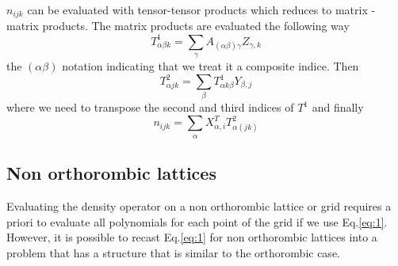 \documentclass[prb]{revtex4}
\begin{document}
$n_{ijk}$ can be evaluated with tensor-tensor products which reduces to matrix -
matrix products. The matrix products are evaluated the following way
\begin{equation}
  \label{eq:collocate:8}
  T^1_{\alpha\beta k} = \sum_{\gamma} A_{(\alpha\beta)\gamma} Z_{\gamma, k}
\end{equation}
the $(\alpha\beta)$ notation indicating that we treat it a composite indice. Then
\begin{equation}
  \label{eq:collocate:9}
  T^2_{\alpha j k} = \sum_{\beta} T^1_{\alpha k \beta} Y_{\beta, j}
\end{equation}
where we need to transpose the second and third indices of $T^1$ and finally
\begin{equation}
  \label{eq:collocate:10}
  n_{ijk} = \sum_{\alpha} X_{\alpha, i} ^T T^2_{\alpha (j k)}
\end{equation}

\subsection{Non orthorombic lattices}
Evaluating the density operator on a non orthorombic lattice or grid requires a
priori to evaluate all polynomials for each point of the grid if we use
Eq.\ref{eq:1}. However, it is possible to recast Eq.\ref{eq:1} for non
orthorombic lattices into a problem that has a structure that is similar to the
orthorombic case.
\end{document}
